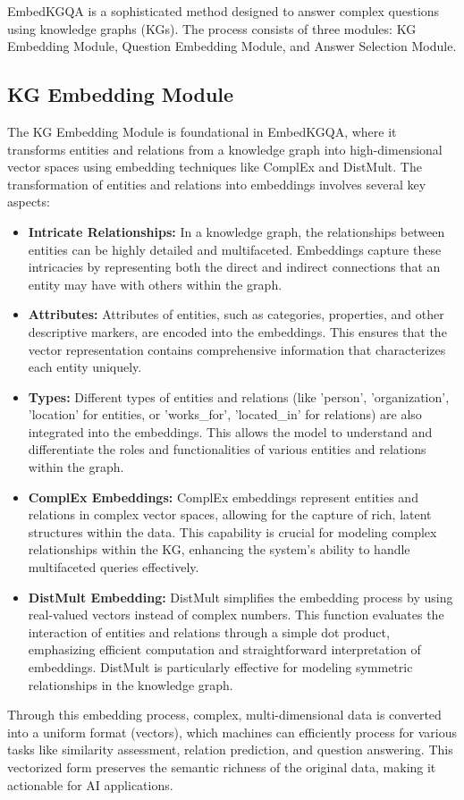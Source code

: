 \documentclass{article}
\begin{document}
EmbedKGQA is a sophisticated method designed to answer complex questions using knowledge graphs (KGs). The process consists of three modules: KG Embedding Module, Question Embedding Module, and Answer Selection Module.

\subsection{KG Embedding Module}
The KG Embedding Module is foundational in EmbedKGQA, where it transforms entities and relations from a knowledge graph into high-dimensional vector spaces using embedding techniques like ComplEx and DistMult. The transformation of entities and relations into embeddings involves several key aspects:
\begin{itemize}
    \item \textbf{Intricate Relationships:} In a knowledge graph, the relationships between entities can be highly detailed and multifaceted. Embeddings capture these intricacies by representing both the direct and indirect connections that an entity may have with others within the graph.

    \item \textbf{Attributes:} Attributes of entities, such as categories, properties, and other descriptive markers, are encoded into the embeddings. This ensures that the vector representation contains comprehensive information that characterizes each entity uniquely.
    \item \textbf{Types:} Different types of entities and relations (like 'person', 'organization', 'location' for entities, or 'works\_for', 'located\_in' for relations) are also integrated into the embeddings. This allows the model to understand and differentiate the roles and functionalities of various entities and relations within the graph.
    \item \textbf{ComplEx Embeddings:} ComplEx embeddings represent entities and relations in complex vector spaces, allowing for the capture of rich, latent structures within the data. This capability is crucial for modeling complex relationships within the KG, enhancing the system's ability to handle multifaceted queries effectively.
    \item \textbf{DistMult Embedding:} DistMult simplifies the embedding process by using real-valued vectors instead of complex numbers. This function evaluates the interaction of entities and relations through a simple dot product, emphasizing efficient computation and straightforward interpretation of embeddings. DistMult is particularly effective for modeling symmetric relationships in the knowledge graph.
\end{itemize}
Through this embedding process, complex, multi-dimensional data is converted into a uniform format (vectors), which machines can efficiently process for various tasks like similarity assessment, relation prediction, and question answering. This vectorized form preserves the semantic richness of the original data, making it actionable for AI applications.
\end{document}
